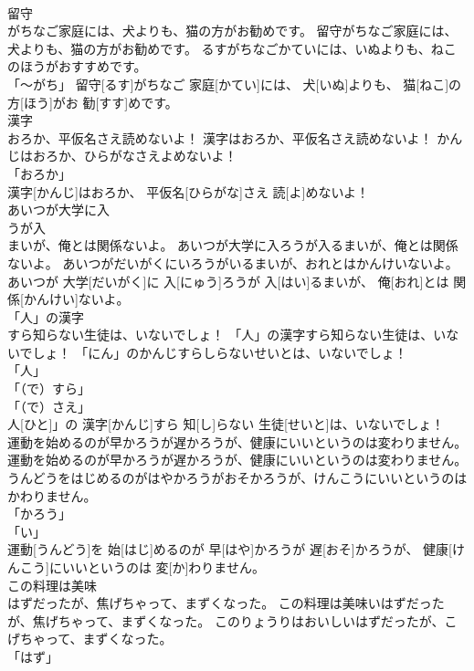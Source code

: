 \documentclass[8pt]{extreport}
\begin{document}
\begin{CJK}{UTF8}{min}
\\	留守
\\	がちなご家庭には、犬よりも、猫の方がお勧めです。	留守がちなご家庭には、犬よりも、猫の方がお勧めです。	るすがちなごかていには、いぬよりも、ねこのほうがおすすめです。	
\\	「～がち」	留守[るす]がちなご 家庭[かてい]には、 犬[いぬ]よりも、 猫[ねこ]の 方[ほう]がお 勧[すす]めです。		
\\	漢字
\\	おろか、平仮名さえ読めないよ！	漢字はおろか、平仮名さえ読めないよ！	かんじはおろか、ひらがなさえよめないよ！	
\\	「おろか」 
\\	漢字[かんじ]はおろか、 平仮名[ひらがな]さえ 読[よ]めないよ！		
\\	あいつが大学に入
\\	うが入
\\	まいが、俺とは関係ないよ。	あいつが大学に入ろうが入るまいが、俺とは関係ないよ。	あいつがだいがくにいろうがいるまいが、おれとはかんけいないよ。	
\\	あいつが 大学[だいがく]に 入[にゅう]ろうが 入[はい]るまいが、 俺[おれ]とは 関係[かんけい]ないよ。		
\\	「人」の漢字
\\	すら知らない生徒は、いないでしょ！	「人」の漢字すら知らない生徒は、いないでしょ！	「にん」のかんじすらしらないせいとは、いないでしょ！	
\\	「人」 
\\	「（で）すら」 
\\	「（で）さえ」 
\\	人[ひと]」の 漢字[かんじ]すら 知[し]らない 生徒[せいと]は、いないでしょ！		
\\	運動を始めるのが早かろうが遅かろうが、健康にいいというのは変わりません。	運動を始めるのが早かろうが遅かろうが、健康にいいというのは変わりません。	うんどうをはじめるのがはやかろうがおそかろうが、けんこうにいいというのはかわりません。	
\\	「かろう」 
\\	「い」 
\\	運動[うんどう]を 始[はじ]めるのが 早[はや]かろうが 遅[おそ]かろうが、 健康[けんこう]にいいというのは 変[か]わりません。		
\\	この料理は美味
\\	はずだったが、焦げちゃって、まずくなった。	この料理は美味いはずだったが、焦げちゃって、まずくなった。	このりょうりはおいしいはずだったが、こげちゃって、まずくなった。	
\\	「はず」 

\end{CJK}
\end{document}
